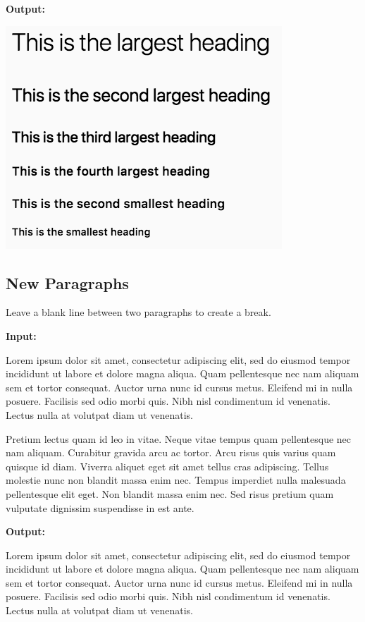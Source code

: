 \documentclass[]{book}
\newenvironment{Shaded}{\begin{snugshade}}{\end{snugshade}}
\newcommand{\NormalTok}[1]{#1}
\theoremstyle{definition}
\theoremstyle{definition}
\theoremstyle{definition}
\theoremstyle{remark}
\begin{document}
\textbf{Output:}

\begin{flushleft}\includegraphics[width=0.5\linewidth]{images/markdownHead} \end{flushleft}

\subsection{New Paragraphs}\label{new-paragraphs}

Leave a blank line between two paragraphs to create a break.

\textbf{Input:}

\begin{Shaded}
\begin{Highlighting}[]
\NormalTok{Lorem ipsum dolor sit amet, consectetur adipiscing elit, sed do eiusmod tempor }
\NormalTok{incididunt ut labore et dolore magna aliqua. Quam pellentesque nec nam aliquam }
\NormalTok{sem et tortor consequat. Auctor urna nunc id cursus metus. Eleifend mi in }
\NormalTok{nulla posuere. Facilisis sed odio morbi quis. Nibh nisl condimentum id venenatis. }
\NormalTok{Lectus nulla at volutpat diam ut venenatis. }

\NormalTok{Pretium lectus quam id leo in vitae. Neque vitae tempus quam pellentesque nec nam }
\NormalTok{aliquam. Curabitur gravida arcu ac tortor. Arcu risus quis varius quam quisque id }
\NormalTok{diam. Viverra aliquet eget sit amet tellus cras adipiscing. Tellus molestie nunc }
\NormalTok{non blandit massa enim nec. Tempus imperdiet nulla malesuada pellentesque elit eget. }
\NormalTok{Non blandit massa enim nec. Sed risus pretium quam vulputate dignissim suspendisse }
\NormalTok{in est ante.}
\end{Highlighting}
\end{Shaded}

\textbf{Output:}

Lorem ipsum dolor sit amet, consectetur adipiscing elit, sed do eiusmod
tempor incididunt ut labore et dolore magna aliqua. Quam pellentesque
nec nam aliquam sem et tortor consequat. Auctor urna nunc id cursus
metus. Eleifend mi in nulla posuere. Facilisis sed odio morbi quis. Nibh
nisl condimentum id venenatis. Lectus nulla at volutpat diam ut
venenatis.
\end{document}
